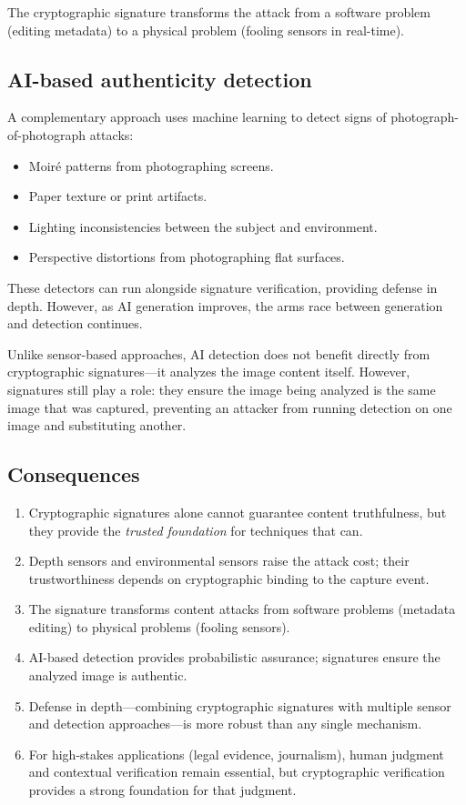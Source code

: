 The cryptographic signature transforms the attack from a software problem
(editing metadata) to a physical problem (fooling sensors in real-time).

\subsection{AI-based authenticity detection}

A complementary approach uses machine learning to detect signs of
photograph-of-photograph attacks:
\begin{itemize}
  \item Moiré patterns from photographing screens.
  \item Paper texture or print artifacts.
  \item Lighting inconsistencies between the subject and environment.
  \item Perspective distortions from photographing flat surfaces.
\end{itemize}

These detectors can run alongside signature verification, providing defense in
depth.
However, as AI generation improves, the arms race between generation and
detection continues.

Unlike sensor-based approaches, AI detection does not benefit directly from
cryptographic signatures---it analyzes the image content itself.
However, signatures still play a role: they ensure the image being analyzed is
the same image that was captured, preventing an attacker from running detection
on one image and substituting another.

\subsection{Consequences}

\begin{enumerate}
  \item Cryptographic signatures alone cannot guarantee content truthfulness,
    but they provide the \emph{trusted foundation} for techniques that can.
  \item Depth sensors and environmental sensors raise the attack cost; their
    trustworthiness depends on cryptographic binding to the capture event.
  \item The signature transforms content attacks from software problems
    (metadata editing) to physical problems (fooling sensors).
  \item AI-based detection provides probabilistic assurance; signatures ensure
    the analyzed image is authentic.
  \item Defense in depth---combining cryptographic signatures with multiple
    sensor and detection approaches---is more robust than any single mechanism.
  \item For high-stakes applications (legal evidence, journalism), human
    judgment and contextual verification remain essential, but cryptographic
    verification provides a strong foundation for that judgment.
\end{enumerate}



